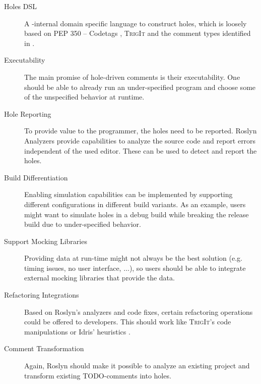 \begin{description}
   \item[Holes DSL] A \CS-internal domain specific language to construct holes, which is loosely based on PEP 350 -- Codetags \cite{elliott_pep_2005}, \textsc{TrigIt} \cite{nie_framework_2019} and the comment types identified in \cite{ying_source_2005}.
   \item[Executability] The main promise of hole-driven comments is their executability. One should be able to already run an under-specified program and choose some of the unspecified behavior at runtime.
   \item[Hole Reporting] To provide value to the programmer, the holes need to be reported. Roslyn Analyzers provide capabilities to analyze the source code and report errors independent of the used editor. These can be used to detect and report the holes.
   \item[Build Differentiation] Enabling simulation capabilities can be implemented by supporting different configurations in different build variants. As an example, users might want to simulate holes in a debug build while breaking the release build due to under-specified behavior.
   \item[Support Mocking Libraries] Providing data at run-time might not always be the best solution (e.g. timing issues, no user interface, $\dotsc$), so users should be able to integrate external mocking libraries that provide the data.
   \item[Refactoring Integrations] Based on Roslyn's analyzers and code fixes, certain refactoring operations could be offered to developers. This should work like \textsc{TrigIt}'s code manipulations \cite{nie_framework_2019} or Idris' heuristics \cite{brady_type-driven_2017}.
   \item[Comment Transformation] Again, Roslyn should make it possible to analyze an existing project and transform existing TODO-comments into holes.
\end{description}